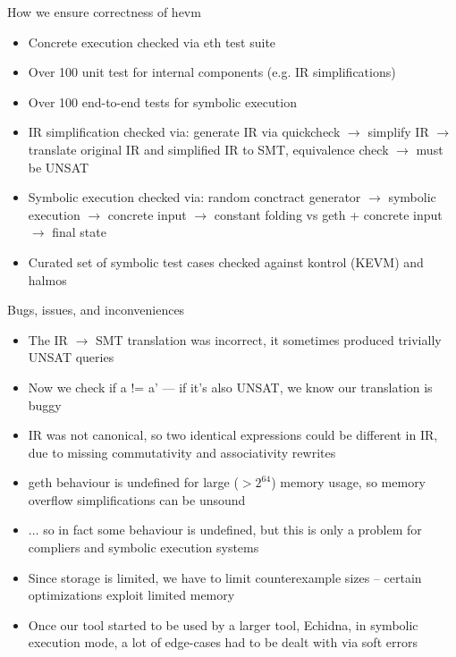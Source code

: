 \documentclass[aspectratio=169]{beamer}
\begin{document}
\begin{frame}{How we ensure correctness of hevm}
\begin{itemize}
    \item Concrete execution checked via eth test suite
    \item Over 100 unit test for internal components (e.g. IR simplifications)
    \item Over 100 end-to-end tests for symbolic execution
    \item IR simplification checked via: generate IR via quickcheck
        $\rightarrow$ simplify IR $\rightarrow$ translate original IR and
        simplified IR to SMT, equivalence check $\rightarrow$ must be UNSAT
    \item Symbolic execution checked via: random conctract generator
        $\rightarrow$ symbolic execution $\rightarrow$ concrete input
        $\rightarrow$ constant folding vs geth + concrete input $\rightarrow$
        final state
    \item Curated set of symbolic test cases checked against kontrol (KEVM) and
        halmos
\end{itemize}
\end{frame}

\begin{frame}{Bugs, issues, and inconveniences}
\begin{itemize}
    \item The IR $\rightarrow$ SMT translation was incorrect, it sometimes produced trivially UNSAT queries
    \item Now we check if a != a' --- if it's also UNSAT, we know our
        translation is buggy
    \item IR was not canonical, so two identical expressions could be different
        in IR, due to missing commutativity and associativity rewrites
    \item geth behaviour is undefined for large ($>2^{64}$) memory usage, so
        memory overflow simplifications can be unsound
    \item $\ldots$ so in fact some behaviour is undefined, but this is only a
        problem for compliers and symbolic execution systems
    \item Since storage is limited, we have to limit counterexample sizes --
        certain optimizations exploit limited memory
    \item Once our tool started to be used by a larger tool, Echidna, in
        symbolic execution mode, a lot of edge-cases had to be dealt with via
        soft errors
\end{itemize}
\end{frame}
\end{document}
